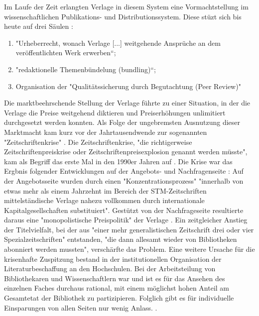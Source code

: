 Im Laufe der Zeit erlangten Verlage in diesem System eine Vormachtstellung im wissenschaftlichen Publikations- und Distributionssystem. Diese stüzt sich bis heute auf drei Säulen \cite{offhaus_2012_institutionelle_repos} \cite{bargheer_2006_open}:
\begin{enumerate}
\item "Urheberrecht, wonach Verlage [...] weitgehende Ansprüche an dem veröffentlichten Werk erwerben“;
\item "redaktionelle Themenbündelung (bundling)“;
\item Organisation der "Qualitätssicherung durch Begutachtung (Peer Review)"
\end{enumerate}

Die marktbeehrschende Stellung der Verlage führte zu einer Situation, in der die Verlage die Preise weitgehend diktieren und Preiserhöhungen unlimitiert durchgesetzt werden konnten. Als Folge der ungebremsten Ausnutzung dieser Marktmacht kam kurz vor der Jahrtausendwende zur sogenannten "Zeitschriftenkrise" \cite{schirmbacher_2009_wisspub} \cite{muller_2010_open}. Die Zeitschriftenkrise, "die richtigerweise Zeitschriftenpreiskrise oder Zeitschriftenpreisexplosion genannt werden müsste"\cite {Brintzinger_2010}, kam als Begriff das erste Mal in den 1990er Jahren auf \cite{Boni_2010}. Die Krise war das Ergbnis folgender Entwicklungen auf der Angebots- und Nachfragenseite \cite{Brintzinger_2010}: Auf der Angebotsseite wurden durch einen "Konzentrationsprozess" "innerhalb von etwas mehr als einem Jahrzehnt im Bereich der STM-Zeitschriften mittelständische Verlage nahezu vollkommen durch internationale Kapitalgesellschaften substituiert". \cite{Brintzinger_2010} Gestützt von der Nachfrageseite resultierte daraus eine "monopolistische Preispolitik" der Verlage \cite{Brintzinger_2010}. Ein zeitgleicher Anstieg der Titelvielfalt, bei der aus "einer mehr generalistischen Zeitschrift drei oder vier Spezialzeitschriften" entstanden, "die dann allesamt wieder von Bibliotheken abonniert werden mussten"\cite{Brintzinger_2010}, verschärfte das Problem. Eine weitere Ursache für die krisenhafte Zuspitzung bestand in der institutionellen Organisation der Literaturbeschaffung an den Hochschulen. Bei der Arbeitsteilung von Bibliothekaren und Wissenschaftlern war und ist es für das Ansehen des einzelnen Faches durchaus rational, mit einem möglichst hohen Anteil am Gesamtetat der Bibliothek zu partizipieren. Folglich gibt es für individuelle Einsparungen von allen Seiten nur wenig Anlass. \cite{Brintzinger_2010}.

